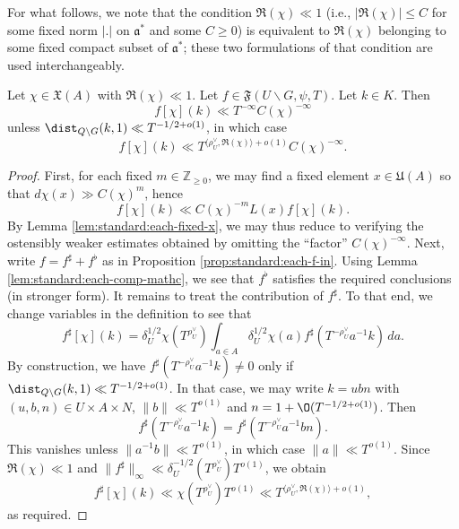 For what follows, we note that the condition $\Re(\chi) \ll 1$ (i.e., $\lvert \Re(\chi) \rvert \leq C$ for some fixed norm $\lvert . \rvert$ on $\mathfrak{a}^\ast$ and some $C \geq 0$) is equivalent to $\Re(\chi)$ belonging to some fixed compact subset of $\mathfrak{a}^*$; these two formulations of that condition are used interchangeably.

\begin{lemma}\label{lem:standard:let-chi-in}
  Let $\chi \in \mathfrak{X}(A)$ with $\Re(\chi) \ll 1$.  Let $f \in \mathfrak{F}(U \backslash G, \psi, T)$.  Let $k \in K$.  Then
  \begin{equation*}
    f[\chi](k) \ll T^{-\infty} C(\chi)^{-\infty}
  \end{equation*}
  unless $\dist_{Q \backslash G}(k,1) \ll T^{-1/2+o(1)}$, in which case
  \begin{equation*}
    f[\chi](k) \ll T^{\langle \rho_U^\vee , \Re(\chi) \rangle + o(1)} C(\chi)^{-\infty}.
  \end{equation*}
\end{lemma}
\begin{proof}
  First, for each fixed $m \in \mathbb{Z}_{\geq 0}$, we may find a fixed element $x \in \mathfrak{U}(A)$ so that $d \chi(x) \gg C(\chi)^m$, hence
  \begin{equation*}
    f[\chi](k) \ll C(\chi)^{-m} L(x) f[\chi](k).
  \end{equation*}
  By Lemma \ref{lem:standard:each-fixed-x}, we may thus reduce to verifying the ostensibly weaker estimates obtained by omitting the ``factor'' $C(\chi)^{-\infty}$.  Next, write $f = f^\sharp + f^\flat$ as in Proposition \ref{prop:standard:each-f-in}.  Using Lemma \ref{lem:standard:each-comp-mathc}, we see that $f^\flat$ satisfies the required conclusions (in stronger form).  It remains to treat the contribution of $f^\sharp$.  To that end, we change variables in the definition to see that
  \begin{equation*}
    f^\sharp[\chi](k) = \delta_U^{1/2} \chi  (T^{\rho_U^\vee}) \int_{a \in A} \delta_U^{1/2} \chi(a) f^\sharp(T^{- \rho_U^\vee } a^{-1} k) \, d a.
  \end{equation*}
  By construction, we have $f^\sharp  (T^{- \rho_U^\vee } a^{-1} k) \neq 0$ only if $\dist_{Q \backslash G}(k,1) \ll T^{-1/2 + o(1)}$.  In that case, we may write $k = u b n$ with $(u,b,n) \in U \times A \times N$, $\|b\| \ll T^{o(1)}$ and $n = 1 + \O(T^{-1/2+o(1)})$.  Then
  \begin{equation*}
    f^\sharp (T^{- \rho_U^\vee } a^{-1} k)
    =
    f^\sharp (T^{- \rho_U^\vee } a^{-1} b n).
  \end{equation*}
  This vanishes unless $\|a^{-1} b \| \ll T^{o(1)}$, in which case $\|a\| \ll T^{o(1)}$.  Since $\Re(\chi) \ll 1$ and $\|f^\sharp \| _\infty \ll \delta_U^{-1/2}(T^{\rho_U^\vee}) T^{o(1)}$, we obtain
  \begin{equation}\label{eq:f-sharp-chik}
    f^\sharp [\chi](k) \ll \chi (T^{\rho_U^\vee })
    T^{o(1)}
    \ll
    T^{\langle \rho_U^\vee , \Re(\chi) \rangle + o(1)},
  \end{equation}
  as required.
\end{proof}

